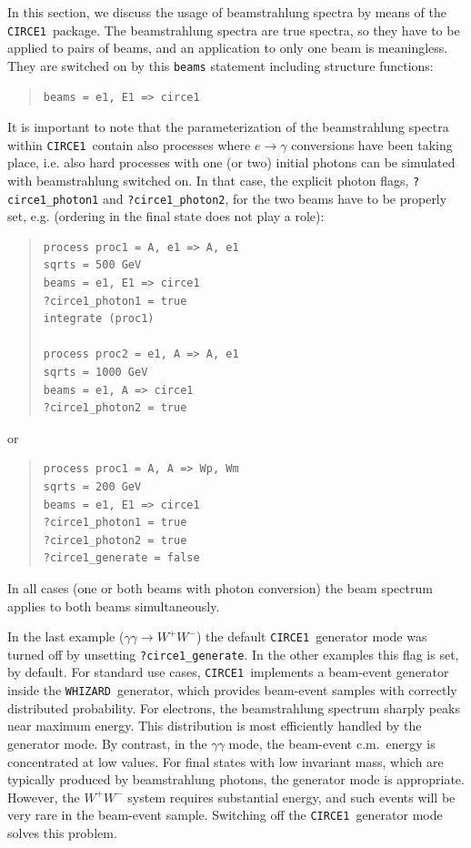 \documentclass[12pt]{book}
\newcommand{\ttt}[1]{\texttt{#1}}
\newcommand{\whizard}{\ttt{WHIZARD}}
\newcommand{\circeone}{\ttt{CIRCE1}}
\begin{document}
In this section, we discuss the usage of beamstrahlung spectra by
means of the \circeone\ package. The beamstrahlung spectra are
true spectra, so they have to be applied to pairs of beams, and an
application to only one beam is meaningless. They are switched on by
this \ttt{beams} statement including structure functions:
\begin{quote}
\begin{footnotesize}
\begin{Verbatim}
beams = e1, E1 => circe1
\end{Verbatim}
\end{footnotesize}
\end{quote}
It is important to note that the parameterization of the beamstrahlung
spectra within \circeone\ contain also processes where $e\to\gamma$
conversions have been taking place, i.e. also hard processes with one
(or two) initial photons can be simulated with beamstrahlung switched
on. In that case, the explicit photon flags, \ttt{?circe1\_photon1}
and \ttt{?circe1\_photon2}, for the two beams have to be properly set,
e.g. (ordering in the final state does not play a role):
\begin{quote}
\begin{footnotesize}
\begin{Verbatim}
process proc1 = A, e1 => A, e1
sqrts = 500 GeV
beams = e1, E1 => circe1
?circe1_photon1 = true
integrate (proc1)

process proc2 = e1, A => A, e1
sqrts = 1000 GeV
beams = e1, A => circe1
?circe1_photon2 = true
\end{Verbatim}
\end{footnotesize}
\end{quote}
or
\begin{quote}
\begin{footnotesize}
\begin{Verbatim}
process proc1 = A, A => Wp, Wm
sqrts = 200 GeV
beams = e1, E1 => circe1
?circe1_photon1 = true
?circe1_photon2 = true
?circe1_generate = false
\end{Verbatim}
\end{footnotesize}
\end{quote}
In all cases (one or both beams with photon conversion) the beam
spectrum applies to both beams simultaneously.

In the last example ($\gamma\gamma\to W^+W^-$) the default
\circeone\ generator mode was turned off by unsetting
\verb|?circe1_generate|.  In the other examples this flag is
set, by default.  For standard use cases,
\circeone\ implements a beam-event generator inside the
\whizard\ generator, which provides beam-event samples with correctly
distributed probability.  For electrons, the beamstrahlung spectrum
sharply peaks near maximum energy.  This distribution is most
efficiently handled by the generator mode.  By contrast, in the $\gamma\gamma$
mode, the beam-event c.m.\ energy is concentrated at low values.  For
final states with low invariant mass, which are typically produced by
beamstrahlung photons, the generator mode is appropriate.
However, the $W^+W^-$ system requires substantial energy, and such
events will be very rare in the beam-event sample.  Switching off the
\circeone\ generator mode solves this
problem.
\end{document}
